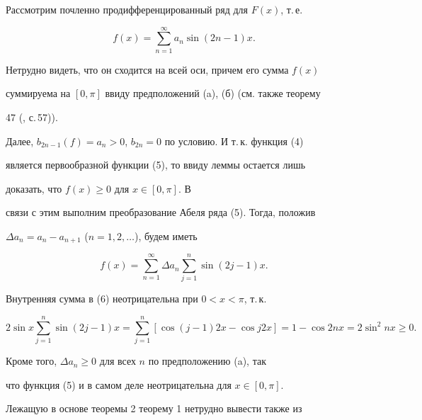  


\begin{pf} 


Рассмотрим почленно продифференцированный ряд для $F(x)$, т.\,е. 


\begin{equation} 


f(x)=\sum^\infty_{n=1}a_n\sin(2n-1)x. 


\end{equation} 


Нетрудно видеть, что он сходится на всей оси, причем его сумма $f(x)$ 


суммируема на $[0,\pi]$ ввиду предположений (a), (б) (см. также теорему 


47 (\cite{3}, с.\,57)). 


 


Далее, $b_{2n-1}(f)=a_n>0$, $b_{2n}=0$ по условию. И т.\,к. функция (4) 


является первообразной функции (5), то ввиду леммы остается лишь 


доказать, что $f(x)\ge 0$ для $x\in[0,\pi]$. В 


связи с этим выполним преобразование Абеля ряда (5). Тогда, положив 


$\Delta a_n=a_n-a_{n+1}$ ($n=1,2,\dotsc$), будем иметь 


\begin{equation} 


f(x)=\sum^\infty_{n=1}\Delta a_n\sum^n_{j=1} 


\sin(2j-1)x. 


\end{equation} 


Внутренняя сумма в (6) неотрицательна при $0<x<\pi$, т.\,к.  


$$ 


2\sin x\sum^n_{j=1}\sin(2j-1)x= 


\sum^n_{j=1}[\cos(j-1)2x-\cos j2x]= 


1-\cos 2nx=2\sin^2nx\ge 0. 


$$ 


Кроме того, $\Delta a_n\ge 0$ для всех $n$ по предположению (a), так 


что функция (5) и в самом деле неотрицательна для $x\in[0,\pi]$. 


\end{pf} 


 


Лежащую в основе теоремы 2 теорему 1 нетрудно вывести также из 


